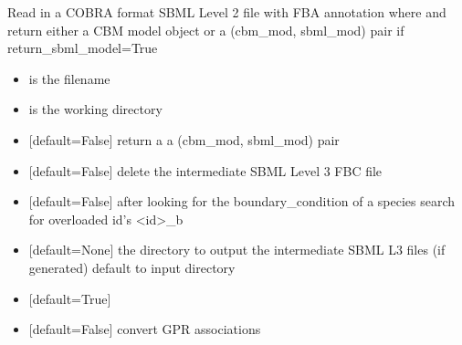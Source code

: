 \documentclass[letterpaper,10pt,english]{sphinxmanual}
\begin{document}
\begin{fulllineitems}
\label{\detokenize{modules_doc:cbmpy.CBXML.sbml_readCOBRASBML}}
\pysigstartsignatures
{}
\pysigstopsignatures
\sphinxAtStartPar
Read in a COBRA format SBML Level 2 file with FBA annotation where and return either a CBM model object
or a (cbm\_mod, sbml\_mod) pair if return\_sbml\_model=True
\begin{itemize}
\item {} 
\sphinxAtStartPar
{} is the filename

\item {} 
\sphinxAtStartPar
{} is the working directory

\item {} 
\sphinxAtStartPar
{} {[}default=False{]} return a a (cbm\_mod, sbml\_mod) pair

\item {} 
\sphinxAtStartPar
{} {[}default=False{]} delete the intermediate SBML Level 3 FBC file

\item {} 
\sphinxAtStartPar
{} {[}default=False{]} after looking for the boundary\_condition of a species search for overloaded id’s \textless{}id\textgreater{}\_b

\item {} 
\sphinxAtStartPar
{} {[}default=None{]} the directory to output the intermediate SBML L3 files (if generated) default to input directory

\item {} 
\sphinxAtStartPar
{} {[}default=True{]}

\item {} 
\sphinxAtStartPar
{} {[}default=False{]} convert GPR associations

\end{itemize}

\end{fulllineitems}
\end{document}
